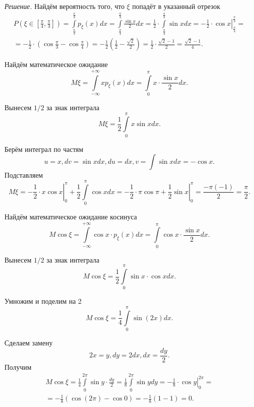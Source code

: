 \textit{Решение.} Найдём вероятность того, что $ \xi $ попадёт в указанный отрезок
\begin{equation*}
\begin{split}
P \left( \xi \in \left[ \frac{ \pi }{4}, \frac{ \pi }{3} \right] \right) =
\int \limits_{ \frac{ \pi }{4}}^{ \frac{ \pi }{3}} p_{ \xi } \left( x \right) dx =
\int \limits_{ \frac{ \pi }{4}}^{ \frac{ \pi }{3}} \frac{ \sin x}{2} dx =
\frac{1}{2} \cdot \int \limits_{ \frac{ \pi }{4}}^{ \frac{ \pi }{3}} \sin x dx =
\left. - \frac{1}{2} \cdot \cos x \right|_{ \frac{ \pi }{4}}^{ \frac{ \pi }{3}} = \\
= - \frac{1}{2} \cdot \left( \cos \frac{ \pi }{3} - \cos \frac{ \pi }{4} \right) =
- \frac{1}{2} \left( \frac{1}{2} - \frac{ \sqrt{2}}{2} \right) =
\frac{1}{2} \cdot \frac{ \sqrt{2} - 1}{2} =
\frac{ \sqrt{2} - 1}{4}.
\end{split}
\end{equation*}

Найдём математическое ожидание
$$M \xi =
\int \limits_{- \infty }^{+ \infty } xp_{ \xi } \left( x \right) dx =
\int \limits_0^{ \pi } x \cdot \frac{ \sin x}{2} dx.$$

Вынесем $1/2$ за знак интеграла
$$M \xi =
\frac{1}{2} \int \limits_0^{ \pi } x \sin x dx.$$

Берём интеграл по частям
$$u = x,
dv = \sin x dx,
du = dx,
v = \int \sin x dx = - \cos x.$$
Подставляем
$$M \xi =
\left. - \frac{1}{2} \cdot x \cos x \right|_0^{ \pi } + \frac{1}{2} \int \limits_0^{ \pi } \cos x dx =
\left. - \frac{1}{2} \cdot \pi \cos \pi + \frac{1}{2} \sin x \right|_0^{ \pi } =
\frac{- \pi \left( -1 \right) }{2} =
\frac{ \pi }{2}.$$

Найдём математическое ожидание косинуса
$$M \cos \xi =
\int \limits_{- \infty }^{+ \infty } \cos x \cdot p_{ \xi } \left( x \right) dx =
\int \limits_0^{ \pi } \cos x \cdot \frac{ \sin x}{2} dx.$$

Вынесем $1/2$ за знак интеграла
$$M \cos \xi =
\frac{1}{2} \int \limits_0^{ \pi } \sin x \cdot \cos x dx.$$

Умножим и поделим на 2
$$M \cos \xi =
\frac{1}{4} \int \limits_0^{ \pi } \sin \left( 2x \right) dx.$$

Сделаем замену
$$2x = y,
dy = 2dx,
dx = \frac{dy}{2}.$$
Получим
\begin{equation*}
\begin{split}
M \cos \xi =
\frac{1}{4} \int \limits_0^{2 \pi } \sin y \cdot \frac{dy}{2} =
\frac{1}{8} \int \limits_0^{2 \pi } \sin y dy =
\left. - \frac{1}{8} \cdot \cos y \right|_0^{2 \pi} = \\
= - \frac{1}{8} \left( \cos \left( 2 \pi \right) - \cos 0 \right) =
- \frac{1}{8} \left( 1 - 1 \right) =
0.
\end{split}
\end{equation*}

